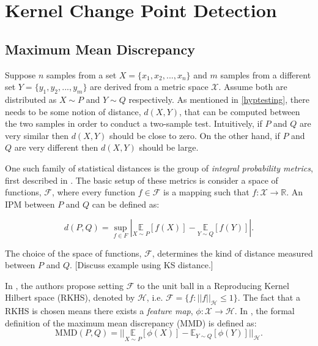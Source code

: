 \chapter{Kernel Change Point Detection}

\section{Maximum Mean Discrepancy}
\label{mmd}
Suppose $n$ samples from a set $X = \{x_1, x_2, ..., x_n\}$ and $m$ samples from a different set $Y=\{y_1, y_2, ..., y_m\}$ are derived from a metric space $\mathcal{X}$. Assume both are distributed as $X \sim  P$ and $Y \sim Q$ respectively. As mentioned in \ref{hyptesting}, there needs to be some notion of distance, $d(X,Y)$, that can be computed between the two samples in order to conduct a two-sample test. Intuitively, if $P$ and $Q$ are very similar then $d(X,Y)$ should be close to zero. On the other hand, if $P$ and $Q$ are very different then $d(X,Y)$ should be large.

One such family of statistical distances is the group of \textit{integral probability metrics}, first described in \cite{muller1997integral}. The basic setup of these metrics is consider a space of functions, $\mathcal{F}$, where every function $f \in \mathcal{F}$ is a mapping such that $f : \mathcal{X}  \rightarrow \mathbb{R}$. An IPM between $P$ and $Q$ can be defined as:

\begin{equation}
d(P,Q)=\sup _{f \in F}|\underset{X \sim P}{\mathbb{E}}[f(X)]-\underset{Y \sim Q}{\mathbb{E}}[f(Y)]|.
\end{equation}

The choice of the space of functions, $\mathcal{F}$, determines the kind of distance measured between $P$ and $Q$. [Discuss example using KS distance.]

In \cite{gretton2012kernel}, the authors propose setting $\mathcal{F}$ to the unit ball in a Reproducing Kernel Hilbert space (RKHS), denoted by $\mathcal{H}$, i.e. $\mathcal{F} = \{f : ||f||_{\mathcal{H}} \leq 1\}$. The fact that a RKHS is chosen means there exists a \textit{feature map}, $\phi: \mathcal{X} \rightarrow \mathcal{H}$. In \cite{smola2007hilbert}, the formal definition of the maximum mean discrepancy (MMD) is defined as:
\begin{equation}
\label{mmd_theory}
\text{MMD}(P,Q)=|| \underset{X \sim P}{\mathbb{E}}[\phi(X)] -  \mathbb{E}_{Y \sim Q}[\phi(Y)]||_\mathcal{H}.
\end{equation}

